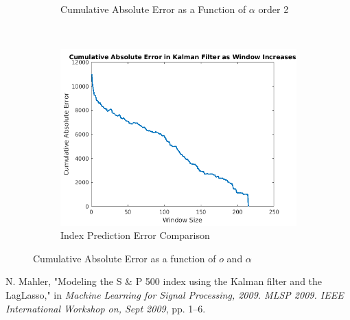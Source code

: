 \documentclass[11pt, fleqn]{article}
\begin{document}
\begin{figure}[!h]
\begin{subfigure}[b]{0.3\textwidth}
	\caption{Cumulative Absolute Error as a Function of $\alpha$ order 2}
	\label{fig:error-alpha-order-2}
    \end{subfigure}
    ~ 
    \begin{subfigure}[b]{0.3\textwidth}
        \includegraphics[width=\textwidth]{kalman-error-vs-window.png}
		\caption{Index Prediction Error Comparison}
		\label{fig:kalman-error-vs-window}
    \end{subfigure}
    \caption{Cumulative Absolute Error as a function of $o$ and $\alpha$}
	\label{fig:o-alpha-error}
\end{figure}

\begin{figure}[!h]
  	\centering
  	
\end{figure}

\begin{thebibliography}{9}
N. Mahler, "Modeling the S \& P 500 index using the Kalman filter and the LagLasso," in \textit{Machine Learning for Signal Processing, 2009. MLSP 2009. IEEE International Workshop on, Sept 2009}, pp. 1–6.

\end{thebibliography}
\end{document}
